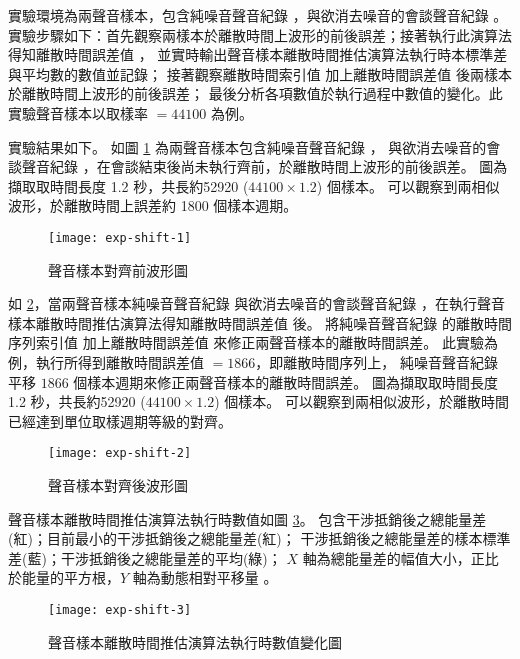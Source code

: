     實驗環境為兩聲音樣本，包含純噪音聲音紀錄 \DEFrecN，與欲消去噪音的會談聲音紀錄 \DEFrecJ。
實驗步驟如下：首先觀察兩樣本於離散時間上波形的前後誤差；接著執行此演算法得知離散時間誤差值 \DEFshift，
並實時輸出聲音樣本離散時間推估演算法執行時本標準差與平均數的數值並記錄；
接著觀察離散時間索引值 \DEFpause 加上離散時間誤差值 \DEFshift 後兩樣本於離散時間上波形的前後誤差；
最後分析各項數值於執行過程中數值的變化。此實驗聲音樣本以取樣率 \DEFsamplerate $= 44100$ 為例。

    實驗結果如下。
如圖 \ref{fig:exp-shift-1} 為兩聲音樣本包含純噪音聲音紀錄 \DEFrecN，
與欲消去噪音的會談聲音紀錄 \DEFrecJ，在會談結束後尚未執行齊前，於離散時間上波形的前後誤差。
圖為擷取取時間長度 1.2 秒，共長約52920 ($44100 \times 1.2 $) 個樣本。
可以觀察到兩相似波形，於離散時間上誤差約 1800 個樣本週期。

\begin{figure}[H]
    \centering
    \texttt{[image: exp-shift-1]}
    \caption{聲音樣本對齊前波形圖}\label{fig:exp-shift-1}
\end{figure}

    如 \ref{fig:exp-shift-2}，當兩聲音樣本純噪音聲音紀錄 \DEFrecN
與欲消去噪音的會談聲音紀錄 \DEFrecJ，在執行聲音樣本離散時間推估演算法得知離散時間誤差值 \DEFshift 後。
將純噪音聲音紀錄 \DEFrecN 的離散時間序列索引值 \DEFpause 加上離散時間誤差值 \DEFshift
來修正兩聲音樣本的離散時間誤差。
此實驗為例，執行所得到離散時間誤差值 \DEFshift $=1866$，即離散時間序列上，
純噪音聲音紀錄 \DEFrecN 平移 $1866$ 個樣本週期來修正兩聲音樣本的離散時間誤差。
圖為擷取取時間長度 1.2 秒，共長約52920 ($44100 \times 1.2 $) 個樣本。
可以觀察到兩相似波形，於離散時間已經達到單位取樣週期等級的對齊。

\begin{figure}[H]
    \centering
    \texttt{[image: exp-shift-2]}
    \caption{聲音樣本對齊後波形圖}\label{fig:exp-shift-2}
\end{figure}

    聲音樣本離散時間推估演算法執行時數值如圖 \ref{fig:exp-shift-3}。
包含干涉抵銷後之總能量差(紅)；目前最小的干涉抵銷後之總能量差(紅)；
干涉抵銷後之總能量差的樣本標準差(藍)；干涉抵銷後之總能量差的平均(綠)；
$X$ 軸為總能量差的幅值大小，正比於能量的平方根，$Y$ 軸為動態相對平移量 \DEFcandiSFT。

\begin{figure}[H]
    \centering
    \texttt{[image: exp-shift-3]}
    \caption{聲音樣本離散時間推估演算法執行時數值變化圖}\label{fig:exp-shift-3}
\end{figure}

